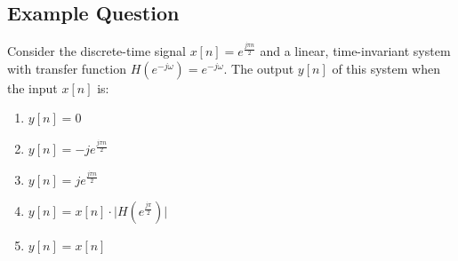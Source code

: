 \subsection{Example Question}
\begin{q}{}
Consider the discrete-time signal $x[n] = e^{\frac{j\pi n}{2}}$ and a linear, time-invariant system with transfer function $H(e^{-j\omega}) = e^{-j \omega}$. The output $y[n]$ of this system when the input $x[n]$ is:

\begin{enumerate}[label=(\alph*)]
    \item $y[n] = 0$
    \item $y[n] = -je^{\frac{j\pi n}{2}}$
    \item $y[n] = je^{\frac{j\pi n}{2}}$
    \item $y[n] = x[n] \cdot \lvert H(e^{\frac{j \pi}{2}})\rvert$
    \item $y[n] = x[n]$
\end{enumerate}
\end{q}

